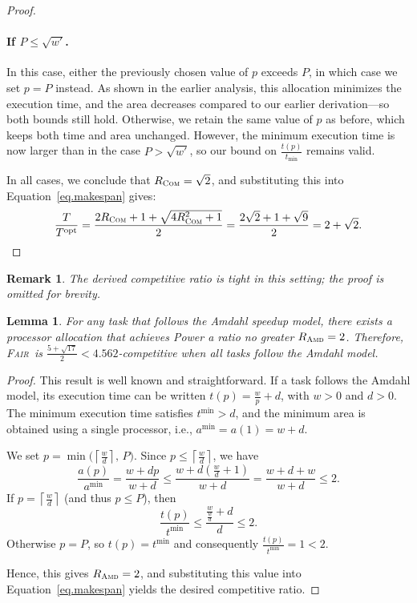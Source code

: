 \documentclass{article}
\newtheorem{lemma}{Lemma}
\newtheorem{remark}{Remark}
\newcommand\fair{\textsc{Fair}\xspace}
\newcommand\ratio{R\xspace}
\newcommand\opt{\textnormal{opt}\xspace}
\newcommand\COM{\textsc{Com}\xspace}
\newcommand\AMD{\textsc{Amd}\xspace}
\begin{document}
\begin{proof}
\paragraph{If \( P \leq \sqrt{w'} \).}

In this case, either the previously chosen value of \( p \) exceeds \( P \), in which case we set \( p = P \) instead. As shown in the earlier analysis, this allocation minimizes the execution time, and the area decreases compared to our earlier derivation—so both bounds still hold. Otherwise, we retain the same value of \( p \) as before, which keeps both time and area unchanged. However, the minimum execution time is now larger than in the case \( P > \sqrt{w'} \), so our bound on \( \frac{t(p)}{t_{\min}} \) remains valid.


In all cases, we conclude that $\ratio_{\COM} = \sqrt{2}$, and substituting this into Equation~\ref{eq.makespan} gives:
\[
\frac{T}{T^{\opt}} = \frac{2\ratio_{\COM} + 1 + \sqrt{4\ratio_{\COM}^2 + 1}}{2} = \frac{2\sqrt{2} + 1 + \sqrt{9}}{2} = 2 + \sqrt{2}.
\]

\end{proof}

\begin{remark}
The derived competitive ratio is tight in this setting; the proof is omitted for brevity.
\end{remark}

\begin{lemma}\label{lem.amdahl}
For any task that follows the Amdahl speedup model, there exists a processor allocation that achieves Power a ratio no greater $\ratio_{\AMD}=2$. Therefore, \fair\ is $\frac{5+\sqrt{17}}{2} < 4.562$-competitive when all tasks follow the Amdahl model.
\end{lemma}

\begin{proof}
This result is well known and straightforward. If a task follows the Amdahl model, its execution time can be written $t(p)=\frac{w}{p}+d$, with $w>0$ and $d>0$. The minimum execution time satisfies $t^{\min}>d$, and the minimum area is obtained using a single processor, i.e., $a^{\min}=a(1)=w+d$.

We set $p=\min\!\bigl(\left\lceil \frac{w}{d} \right\rceil,\,P\bigr)$. Since $p\le\left\lceil \frac{w}{d} \right\rceil$, we have
\[
\frac{a(p)}{a^{\min}}
    =\frac{w+dp}{w+d}
    \le\frac{w+d\left(\frac{w}{d}+1\right)}{w+d}
    =\frac{w+d+w}{w+d}\le 2 .
\]
If $p=\left\lceil \tfrac{w}{d} \right\rceil$ (and thus $p\le P$), then
\[
\frac{t(p)}{t^{\min}}
    \le\frac{\frac{w}{\frac{w}{d}}+d}{d}
    \le 2 .
\]
Otherwise $p=P$, so $t(p)=t^{\min}$ and consequently $\tfrac{t(p)}{t^{\min}}=1<2$.

Hence, this gives $\ratio_{\AMD}=2$, and substituting this value into Equation~\ref{eq.makespan} yields the desired competitive ratio.
\end{proof}
\end{document}
